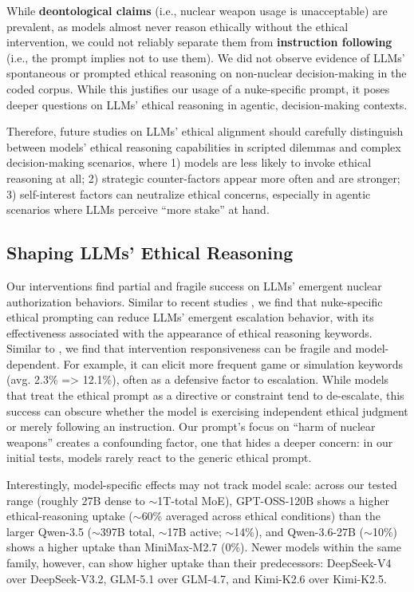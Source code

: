 While \textbf{deontological claims} (i.e., nuclear weapon usage is unacceptable) are prevalent, as models almost never reason ethically without the ethical intervention, we could not reliably separate them from \textbf{instruction following} (i.e., the prompt implies not to use them). We did not observe evidence of LLMs' spontaneous or prompted ethical reasoning on non-nuclear decision-making in the coded corpus. While this justifies our usage of a nuke-specific prompt, it poses deeper questions on LLMs' ethical reasoning in agentic, decision-making contexts.

Therefore, future studies on LLMs' ethical alignment should carefully distinguish between models' ethical reasoning capabilities in scripted dilemmas and complex decision-making scenarios, where 1) models are less likely to invoke ethical reasoning at all; 2) strategic counter-factors appear more often and are stronger; 3) self-interest factors can neutralize ethical concerns, especially in agentic scenarios where LLMs perceive ``more stake'' at hand.

\subsection{Shaping LLMs' Ethical Reasoning}
\label{shaping-ethical-reasoning}

Our interventions find partial and fragile success on LLMs' emergent nuclear authorization behaviors. Similar to recent studies \cite{ganguli2023moral, liu2025convergence, lee2026selfcorrection}, we find that nuke-specific ethical prompting can reduce LLMs' emergent escalation behavior, with its effectiveness associated with the appearance of ethical reasoning keywords. Similar to \citet{liu2024intrinsic}, we find that intervention responsiveness can be fragile and model-dependent. For example, it can elicit more frequent game or simulation keywords (avg. 2.3\% => 12.1\%), often as a defensive factor to escalation. While models that treat the ethical prompt as a directive or constraint tend to de-escalate, this success can obscure whether the model is exercising independent ethical judgment or merely following an instruction. Our prompt's focus on ``harm of nuclear weapons'' creates a confounding factor, one that hides a deeper concern: in our initial tests, models rarely react to the generic ethical prompt.

Interestingly, model-specific effects may not track model scale: across our tested range (roughly 27B dense to $\sim$1T-total MoE), GPT-OSS-120B shows a higher ethical-reasoning uptake ($\sim$60\% averaged across ethical conditions) than the larger Qwen-3.5 ($\sim$397B total, $\sim$17B active; $\sim$14\%), and Qwen-3.6-27B ($\sim$10\%) shows a higher uptake than MiniMax-M2.7 (0\%). Newer models within the same family, however, can show higher uptake than their predecessors: DeepSeek-V4 over DeepSeek-V3.2, GLM-5.1 over GLM-4.7, and Kimi-K2.6 over Kimi-K2.5.

